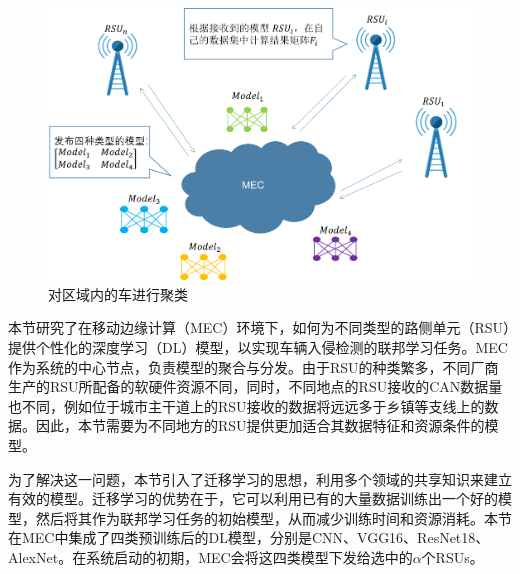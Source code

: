 \begin{figure}[htb]
\centering
    \includegraphics[scale=0.6]{figures/figure2.png}
    \caption{对区域内的车进行聚类}
    \label{fig:Cluster the cars in the region}
\end{figure}

本节研究了在移动边缘计算（MEC）环境下，如何为不同类型的路侧单元（RSU）提供个性化的深度学习（DL）模型，以实现车辆入侵检测的联邦学习任务。MEC作为系统的中心节点，负责模型的聚合与分发。由于RSU的种类繁多，不同厂商生产的RSU所配备的软硬件资源不同，同时，不同地点的RSU接收的CAN数据量也不同，例如位于城市主干道上的RSU接收的数据将远远多于乡镇等支线上的数据。因此，本节需要为不同地方的RSU提供更加适合其数据特征和资源条件的模型。

为了解决这一问题，本节引入了迁移学习的思想，利用多个领域的共享知识来建立有效的模型。迁移学习的优势在于，它可以利用已有的大量数据训练出一个好的模型，然后将其作为联邦学习任务的初始模型，从而减少训练时间和资源消耗。本节在MEC中集成了四类预训练后的DL模型，分别是CNN、VGG16、ResNet18、AlexNet。在系统启动的初期，MEC会将这四类模型下发给选中的$\alpha$个RSUs。

